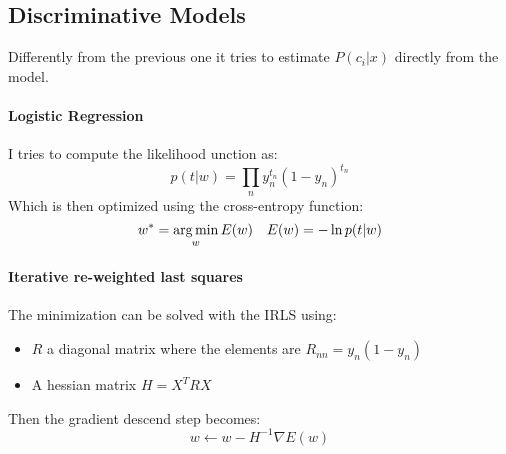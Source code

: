 \subsection{Discriminative Models}
Differently from the previous one it tries to estimate $P(c_i|x)$ directly from the model.

\paragraph{Logistic Regression}
I tries to compute the likelihood unction as:
$$p(t|w)=\prod_n y_n^{t_n}(1-y_n)^{t_n}$$
Which is then optimized using the cross-entropy function:
$$w^*=\operatorname*{arg\,min}_w E(w)\quad E(w)=-\ln p(t|w)$$

\paragraph{Iterative re-weighted last squares}
The minimization can be solved with the IRLS using:
\begin{itemize}
\item $R$ a diagonal matrix where the elements are $R_{nn}=y_n(1-y_n)$
\item A hessian matrix $H=X^TRX$
\end{itemize}
Then the gradient descend step becomes:
$$w \leftarrow w-H^{-1}\nabla E(w)$$
